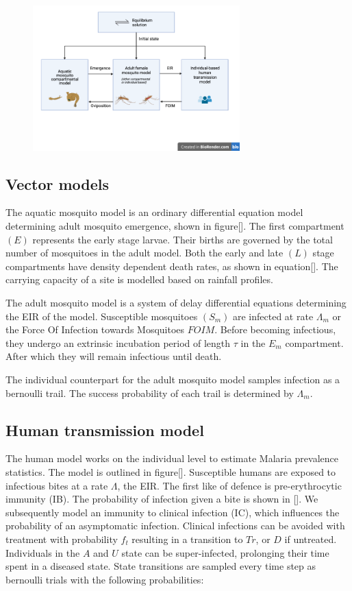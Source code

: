 \documentclass{bmcart}
\begin{document}
\begin{figure}[h]
\includegraphics[width=8cm]{Malariasimulation.png}
\end{figure}

\subsection*{Vector models}

The aquatic mosquito model is an ordinary differential equation model determining adult mosquito emergence, shown in figure[]. The first compartment $(E)$ represents the early stage larvae. Their births are governed by the total number of mosquitoes in the adult model. Both the early and late $(L)$ stage compartments have density dependent death rates, as shown in equation[]. The carrying capacity of a site is modelled based on rainfall profiles.

The adult mosquito model is a system of delay differential equations determining the EIR of the model. Susceptible mosquitoes $(S_m)$ are infected at rate $\Lambda_m$ or the Force Of Infection towards Mosquitoes \(FOIM\). Before becoming infectious, they undergo an extrinsic incubation period of length $\tau$ in the $E_m$ compartment. After which they will remain infectious until death.

The individual counterpart for the adult mosquito model samples infection as a bernoulli trail. The success probability of each trail is determined by $\Lambda_m$.

\subsection*{Human transmission model}

The human model works on the individual level to estimate Malaria prevalence statistics. The model is outlined in figure[]. Susceptible humans are exposed to infectious bites at a rate $\Lambda$, the EIR. The first like of defence is pre-erythrocytic immunity (IB). The probability of infection given a bite is shown in []. We subsequently model an immunity to clinical infection (IC), which influences the probability of an asymptomatic infection. Clinical infections can be avoided with treatment with probability $f_t$ resulting in a transition to $Tr$, or $D$ if untreated. Individuals in the $A$ and $U$ state can be super-infected, prolonging their time spent in a diseased state. State transitions are sampled every time step as bernoulli trials with the following probabilities:
\end{document}
